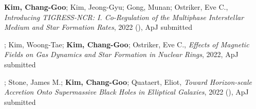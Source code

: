 \item \textbf{Kim, Chang-Goo}; Kim, Jeong-Gyu; Gong, Munan; Ostriker, Eve C., \textit{Introducing TIGRESS-NCR: I. Co-Regulation of the Multiphase Interstellar Medium and Star Formation Rates}, 2022 (), ApJ submitted
\item {}; Kim, Woong-Tae; \textbf{Kim, Chang-Goo}; Ostriker, Eve C., \textit{Effects of Magnetic Fields on Gas Dynamics and Star Formation in Nuclear Rings}, 2022, ApJ submitted
\item {}; Stone, James M.; \textbf{Kim, Chang-Goo}; Quataert, Eliot, \textit{Toward Horizon-scale Accretion Onto Supermassive Black Holes in Elliptical Galaxies}, 2022 (), ApJ submitted
